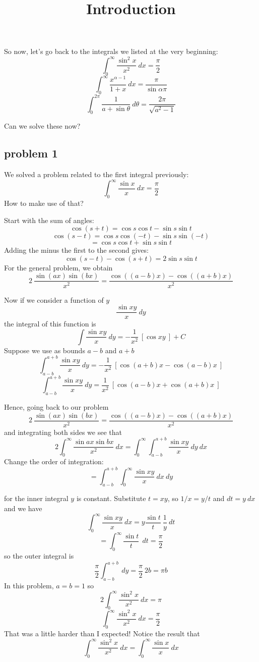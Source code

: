 \documentclass[11pt, oneside]{article}
\title{Introduction}
\date{}
\begin{document}
\maketitle
\Large

So now, let's go back to the integrals we listed at the very beginning:
\[ \int_0^{\infty} \frac{\sin^2 x}{x^2} \ dx = \frac{\pi}{2} \]
\[ \int_0^{\infty} \frac{x^{\alpha - 1}}{1 + x} \ dx = \frac{\pi}{\sin \alpha \pi} \]
\[ \int_0^{2 \pi} \frac{1}{a + \sin \theta} \ d \theta = \frac{2 \pi}{\sqrt{a^2 - 1}} \]

Can we solve these now?  
\subsection*{problem 1}
We solved a problem related to the first integral previously:
\[ \int_0^{\infty} \frac{\sin x}{x} \ dx = \frac{\pi}{2} \]
How to make use of that?

Start with the sum of angles:
\[ \cos (s+t) = \cos s \cos t - \sin s \sin t \]
\[ \cos (s-t) = \cos s \cos (-t) - \sin s \sin (-t) \]
\[ = \cos s \cos t + \sin s \sin t \]
Adding the minus the first to the second gives:
\[ \cos (s-t) - \cos(s+t) = 2 \sin s \sin t \]
For the general problem, we obtain
\[ 2 \ \frac{\sin(ax) \sin(bx)}{x^2} =  \frac{\cos ((a-b)x) - \cos((a+b)x) }{x^2}  \]

Now if we consider a function of $y$
\[ \frac{\sin x y}{x} \ dy \]
the integral of this function is
\[ \int \frac{\sin x y}{x} \ dy = -\frac{1}{x^2} \ [ \cos x y \ ] + C \]
Suppose we use as bounds $a-b$ and $a+b$
\[ \int_{a-b}^{a+b} \frac{\sin x y}{x} \ dy = -\frac{1}{x^2} \ [ \cos (a+b) x  - \cos(a-b) x \ ] \]
\[  \int_{a-b}^{a+b} \frac{\sin x y}{x} \ dy = \frac{1}{x^2} \ [ \cos (a-b) x  + \cos(a+b) x \ ] \]

Hence, going back to our problem
\[ 2 \ \frac{\sin(ax) \sin(bx)}{x^2} =  \frac{\cos ((a-b)x) - \cos((a+b)x) }{x^2}  \]
and integrating both sides we see that
\[ 2 \int_0^{\infty} \frac{\sin ax \sin bx}{x^2} \ dx = \int_0^{\infty} \int_{a-b}^{a+b} \frac{\sin x y}{x} \ dy  \ dx \]
Change the order of integration:
\[ = \int_{a-b}^{a+b} \int_0^{\infty} \frac{\sin x y}{x} \ dx  \ dy \]

for the inner integral $y$ is constant.  Substitute $t = xy$, so $1/x = y/t$ and $dt = y \ dx$ and we have
\[ \int_0^{\infty} \frac{\sin x y}{x} \ dx = y \frac{\sin t}{t} \ \frac{1}{y} \ dt \]
\[ = \int_0^{\infty}  \frac{\sin t}{t} \ \ dt = \frac{\pi}{2} \]
so the outer integral is
\[ \frac{\pi}{2} \int_{a-b}^{a+b}  \ dy = \frac{\pi}{2} \ 2b = \pi b \]
In this problem, $a = b = 1$ so
\[ 2 \int_0^{\infty} \frac{\sin^2 x}{x^2} \ dx = \pi \]
\[ \int_0^{\infty} \frac{\sin^2 x}{x^2} \ dx = \frac{\pi}{2} \]
That was a little harder than I expected!  Notice the result that
\[ \int_0^{\infty} \frac{\sin^2 x}{x^2} \ dx = \int_0^{\infty} \frac{\sin x}{x} \ dx  \]
\end{document}
